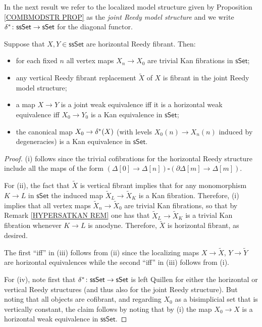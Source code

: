 \documentclass[a4paper,10pt
,draft
]{article}%
\begin{document}
In the next result we refer to the localized model structure given by Proposition \ref{COMBMODSTR PROP} as the 
\textit{joint Reedy model structure} and
we write $\delta^{\**} \colon \mathsf{ssSet} \to \mathsf{sSet}$
for the diagonal functor.

\begin{proposition}\label{SSSETJREE PROP}
	Suppose that $X, Y \in \mathsf{ssSet}$ are horizontal Reedy fibrant. Then:
\begin{itemize}
	\item[(i)] for each fixed $n$ all vertex maps $X_{n} \to X_{0}$ are trivial Kan fibrations in $\mathsf{sSet}$;
	\item[(ii)] any vertical Reedy fibrant replacement $\tilde{X}$ of $X$ is fibrant in the joint Reedy model structure;
	\item[(iii)] a map $X \to Y$ is a joint weak equivalence
	iff it is a horizontal weak equivalence 
	iff $X_0 \to Y_0$ is a Kan equivalence in $\mathsf{sSet}$;
	\item[(iv)] the canonical map $X_{0} \to \delta^{\**}(X)$
	(with levels $X_0(n) \to X_n(n)$ induced by degeneracies) is a Kan equivalence in $\mathsf{sSet}$. 
\end{itemize}
\end{proposition}


\begin{proof}
(i) follows since the trivial cofibrations for the horizontal Reedy structure include all the maps of the form
$(\Delta[0] \to \Delta[n]) \square (\partial \Delta[m] \to \Delta[m])$.

For (ii), the fact that $\tilde{X}$ is vertical fibrant
implies that for any monomorphism $K \to L$ in $\mathsf{sSet}$
the induced map $\tilde{X}_L \to \tilde{X}_K$ is a Kan fibration. Therefore, (i) implies that all vertex maps
$\tilde{X}_{n} \to \tilde{X}_{0}$
are trivial Kan fibrations, so that by
Remark \ref{HYPERSATKAN REM} one has that 
$\tilde{X}_L \to \tilde{X}_K$ is a trivial Kan fibration whenever
$K \to L$ is anodyne.
Therefore, $\tilde{X}$ is horizontal fibrant, as desired.


The first ``iff'' in (iii) follows from (ii) since the localizing maps 
$X \to \tilde{X}$, $Y \to \tilde{Y}$
are horizontal equivalences
while the second ``iff'' in (iii) follows from (i).

For (iv), note first that 
$\delta^{\**} \colon \mathsf{ssSet} \to \mathsf{sSet}$
is left Quillen for either the horizontal or vertical Reedy structures (and thus also for the joint Reedy structure).
But noting that all objects are cofibrant, and regarding 
$X_{0}$ as a bisimplicial set that is vertically constant, 
the claim follows by noting that by (i) the map
$X_{0} \to X$ is a horizontal weak equivalence in $\mathsf{ssSet}$.
\end{proof}
\end{document}
